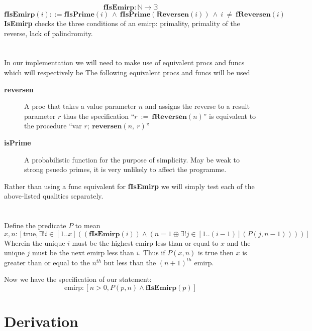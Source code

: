 \documentclass[a4paper]{article}
\begin{document}
$$ \textbf{fIsEmirp}: \mathbb{N} \rightarrow \mathbb{B}$$
$$ \textbf{fIsEmirp}(i) ::= \textbf{fIsPrime}(i)\ \land\ \textbf{fIsPrime}(\textbf{Reversen}(i))\ \land\ i\ \neq\ \textbf{fReversen}(i) $$
\textbf{IsEmirp} checks the three conditions of an emirp: primality, primality of the reverse, lack of palindromity.
\\ \\ \\
In our implementation we will need to make use of equivalent procs and funcs which will respectively be
The following equivalent procs and funcs will be used 
\begin{description}
		\item[\textbf{reversen}] A proc that takes a value parameter $n$ and assigns the reverse to a result parameter $r$ thus the specification ``$r\ :=\ \textbf{fReversen}(n)$'' is equivalent to the procedure ``var $r;\ \textbf{reversen}(n,\ r)$''
		\item[\textbf{isPrime}] A probabilistic function for the purpose of simplicity. May be weak to strong psuedo primes, it is very unlikely to affect the programme.
\end{description}
Rather than using a func equivalent for \textbf{fIsEmirp} we will simply test each of the above-listed qualities separately.
\\\\\\
\noindent
Define the predicate $P$ to mean $$x, n :[\text{true}, \exists! i \in [1..x] ((\textbf{fIsEmirp}(i)) \land (n = 1 \oplus \exists!j\in [1..(i-1)](P(j, n-1))))]$$
Wherein the unique $i$ must be the highest emirp less than or equal to $x$ and the unique $j$ must be the next emirp less than $i$. Thus if $P(x, n)$ is true then $x$ is greater than or equal to the $n^{th}$ but less than the $(n+1)^{th}$ emirp.



\noindent
Now we have the specification of our statement:
$$ \text{emirp}:[n>0, P(p, n) \land \textbf{fIsEmirp}(p)]$$


\section{Derivation}
\end{document}
